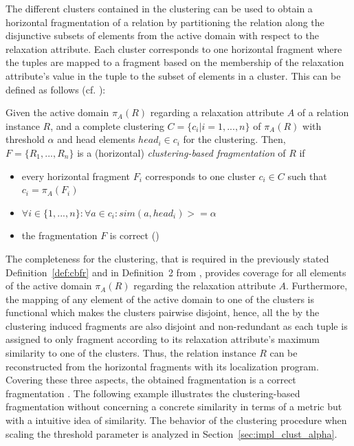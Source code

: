 The different clusters contained in the clustering can be used to obtain a horizontal fragmentation of a relation by partitioning the relation along the 
disjunctive subsets of elements from the active domain with respect to the relaxation attribute. Each cluster corresponds to one horizontal fragment where
the tuples are mapped to a fragment based on the membership of the relaxation attribute's value in the tuple to the subset of elements in a cluster. This 
can be defined as follows (cf. \cite[Definition~2]{Wiese2014}):

\begin{definition} \label{def:cbfr}
Given the active domain $\pi_A(R)$ regarding a relaxation attribute $A$ of a relation instance $R$, and a complete clustering $C=\{c_i|i=1,...,n\}$
of $\pi_A(R)$ with threshold $\alpha$ and head elements $head_i \in c_i$ for the clustering. Then, $F=\{R_1,...,R_n\}$ is a (horizontal) 
\emph{clustering-based fragmentation} of $R$ if
\begin{itemize}
    \item every horizontal fragment $F_i$ corresponds to one cluster $c_i \in C$ such that $c_i=\pi_A(F_i)$
    \item $\forall i \in \{1,...,n\}: \forall a \in c_i: sim(a, head_i)>=\alpha$
    \item the fragmentation $F$ is correct (\cite[p.~103]{Ozsu1991})
\end{itemize}
\end{definition}

The completeness for the clustering, that is required in the previously stated Definition~\ref{def:cbfr} and in Definition~2 from \cite{Wiese2014},
provides coverage for all elements of the active domain $\pi_A(R)$ regarding the relaxation attribute $A$. Furthermore, the mapping of any element of the
active domain to one of the clusters is functional which makes the clusters pairwise disjoint, hence, all the by the clustering induced fragments are also
disjoint and non-redundant as each tuple is assigned to only fragment according to its relaxation attribute's maximum similarity to one of the clusters.
Thus, the relation instance $R$ can be reconstructed from the horizontal fragments with its localization program. Covering these three aspects, the
obtained fragmentation is a correct fragmentation \cite[p.~103]{Ozsu1991}. The following example illustrates the clustering-based fragmentation without
concerning a concrete similarity in terms of a metric but with a intuitive idea of similarity. The behavior of the clustering procedure when scaling the
threshold parameter is analyzed in Section~\ref{sec:impl_clust_alpha}.

